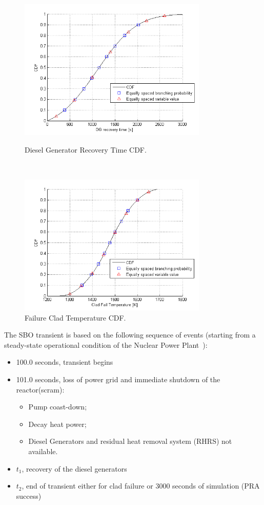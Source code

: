 \documentclass{mc2013}
\begin{document}
\begin{figure}
 \begin{minipage}[b]{8.5cm}
   \centering
   \includegraphics[width=9cm]{figures/DieselRecTime.png}
   \caption{Diesel Generator Recovery Time CDF.}
   \label{fig:DGrecTime}
 \end{minipage}
 \ \hspace{2mm} \hspace{3mm} \
 \begin{minipage}[b]{8.5cm}
  \centering
   \includegraphics[width=9cm]{figures/CladFailure.png}
   \caption{Failure Clad Temperature CDF.}
   \label{fig:CladFailureDist}
 \end{minipage}
\end{figure}
The SBO transient is based on the following sequence of events (starting from a steady-state operational condition of the Nuclear Power Plant~\cite{relap7FY12}):
\vspace{-5mm}
 \begin{itemize}
   \item 100.0 seconds, transient begins
   \item 101.0 seconds, loss of power grid and immediate shutdown of the reactor(scram):
   \begin{itemize}
       \item Pump coast-down;  
       \item Decay heat power;
       \item Diesel Generators and residual heat removal system (RHRS) not available. 
    \end{itemize}
   \item $t_{1}$, recovery of the diesel generators
   \item $t_{2}$, end of transient either for clad failure or 3000 seconds of simulation (PRA success)
\end{itemize}
\end{document}
